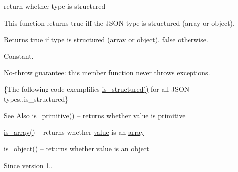 return whether type is structured 

This function returns true iff the J\-S\-O\-N type is structured (array or object).

\begin{DoxyReturn}{Returns}
{\ttfamily true} if type is structured (array or object), {\ttfamily false} otherwise.
\end{DoxyReturn}
Constant.

No-\/throw guarantee\-: this member function never throws exceptions.

\{The following code exemplifies {\ttfamily \hyperlink{classnlohmann_1_1basic__json_a873f4bff2f2a83f68fc1b5341ebdd446}{is\-\_\-structured()}} for all J\-S\-O\-N types.,is\-\_\-structured\}

\begin{DoxySeeAlso}{See Also}
\hyperlink{classnlohmann_1_1basic__json_adcd6086bac286854d5cc8b7f84d74a49}{is\-\_\-primitive()} -- returns whether \hyperlink{classnlohmann_1_1basic__json_a0a2cbbd95862a623e7dc5c37e67dead0}{value} is primitive 

\hyperlink{classnlohmann_1_1basic__json_a256a4cef002023acab3c9d75b569f54a}{is\-\_\-array()} -- returns whether \hyperlink{classnlohmann_1_1basic__json_a0a2cbbd95862a623e7dc5c37e67dead0}{value} is an \hyperlink{classnlohmann_1_1basic__json_a5685815624b086caa532f41e853d4b0f}{array} 

\hyperlink{classnlohmann_1_1basic__json_a94ba313c00f1713fa4be85de64083754}{is\-\_\-object()} -- returns whether \hyperlink{classnlohmann_1_1basic__json_a0a2cbbd95862a623e7dc5c37e67dead0}{value} is an \hyperlink{classnlohmann_1_1basic__json_ad25b2f8c21e241e2d63455537a9294ff}{object}
\end{DoxySeeAlso}
\begin{DoxySince}{Since}
version 1.. 
\end{DoxySince}
